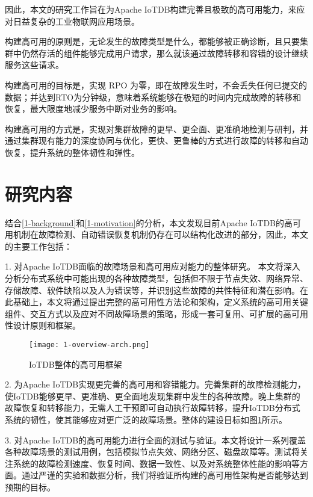 因此，本文的研究工作旨在为Apache IoTDB构建完善且极致的高可用能力，来应对日益复杂的工业物联网应用场景。

构建高可用的原则是，无论发生的故障类型是什么，都能够被正确诊断，且只要集群中仍然存活的组件能够完成用户请求，那么就该通过故障转移和容错的设计继续服务这些请求。

构建高可用的目标是，实现 RPO 为零，即在故障发生时，不会丢失任何已提交的数据；并达到RTO为分钟级，意味着系统能够在极短的时间内完成故障的转移和恢复，最大限度地减少服务中断对业务的影响。

构建高可用的方式是，实现对集群故障的更早、更全面、更准确地检测与研判，并通过集群现有能力的深度协同与优化，更快、更鲁棒的方式进行故障的转移和自动恢复，提升系统的整体韧性和弹性。


\section{研究内容}

结合\ref{1-background}和\ref{1-motivation}的分析，本文发现目前Apache IoTDB的高可用机制在故障检测、自动错误恢复机制仍存在可以结构化改进的部分，因此，本文的主要工作包括：

1. 对Apache IoTDB面临的故障场景和高可用应对能力的整体研究。
本文将深入分析分布式系统中可能出现的各种故障类型，包括但不限于节点失效、网络异常、存储故障、软件缺陷以及人为错误等，并识别这些故障的共性特征和潜在影响。在此基础上，本文将通过提出完整的高可用性方法论和架构，定义系统的高可用关键组件、交互方式以及应对不同故障场景的策略，形成一套可复用、可扩展的高可用性设计原则和框架。


\begin{figure}
  \centering
  \texttt{[image: 1-overview-arch.png]}
  \caption{IoTDB整体的高可用框架}
  \label{fig:c01-overview-arch}
\end{figure}

2. 为Apache IoTDB实现更完善的高可用和容错能力。完善集群的故障检测能力，使IoTDB能够更早、更准确、更全面地发现集群中发生的各种故障。晚上集群的故障恢复和转移能力，无需人工干预即可自动执行故障转移，提升IoTDB分布式系统的韧性，使其能够应对更广泛的故障场景。整体的建设目标如图\ref{fig:c01-overview-arch}所示。


3. 对Apache IoTDB的高可用能力进行全面的测试与验证。本文将设计一系列覆盖各种故障场景的测试用例，包括模拟节点失效、网络分区、磁盘故障等。测试将关注系统的故障检测速度、恢复时间、数据一致性、以及对系统整体性能的影响等方面。通过严谨的实验和数据分析，我们将验证所构建的高可用性架构是否能够达到预期的目标。



